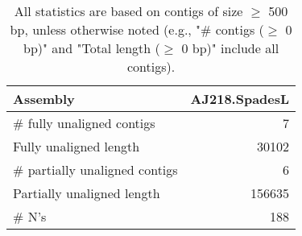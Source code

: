 \documentclass[12pt,a4paper]{article}
\begin{document}
\begin{table}[ht]
\begin{center}
\caption{All statistics are based on contigs of size $\geq$ 500 bp, unless otherwise noted (e.g., "\# contigs ($\geq$ 0 bp)" and "Total length ($\geq$ 0 bp)" include all contigs).}
\begin{tabular}{|l*{1}{|r}|}
\hline
Assembly & AJ218.SpadesL \\ \hline
\# fully unaligned contigs & 7 \\ \hline
Fully unaligned length & 30102 \\ \hline
\# partially unaligned contigs & 6 \\ \hline
Partially unaligned length & 156635 \\ \hline
\# N's & 188 \\ \hline
\end{tabular}
\end{center}
\end{table}
\end{document}
